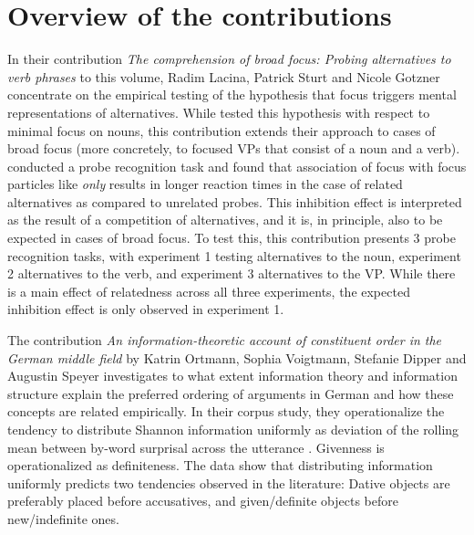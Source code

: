 \documentclass[output=paper,colorlinks,citecolor=brown]{langscibook}
\begin{document}
\section{Overview of the contributions}

In their contribution \textit{The comprehension of broad focus: Probing alternatives to verb phrases} to this volume, Radim Lacina, Patrick Sturt and Nicole Gotzner concentrate on the empirical testing of the hypothesis that focus triggers mental representations of alternatives. While \citet{gotzner2016impact} tested this hypothesis with respect to minimal focus on nouns, this contribution extends their approach to cases of broad focus (more concretely, to focused VPs that consist of a noun and a verb). \citet{gotzner2016impact} conducted a probe recognition task and found that association of focus with focus particles like \textit{only} results in longer reaction times in the case of related alternatives as compared to unrelated probes. This inhibition effect is interpreted as the result of a competition of alternatives, and it is, in principle, also to be expected in cases of broad focus. To test this, this contribution presents 3 probe recognition tasks, with experiment 1 testing alternatives to the noun, experiment 2 alternatives to the verb, and experiment 3 alternatives to the VP. While there is a main effect of relatedness across all three experiments, the expected inhibition effect is only observed in experiment 1.

The contribution \textit{An information-theoretic account of constituent order in the German middle field} by Katrin Ortmann, Sophia Voigtmann, Stefanie Dipper and Augustin Speyer investigates to what extent information theory and information structure explain the preferred ordering of arguments in German and how these concepts are related empirically. In their corpus study, they operationalize the tendency to distribute Shannon information uniformly as deviation of the rolling mean between by-word surprisal across the utterance \citep{cuskley21}. Givenness is operationalized as definiteness. The data show that distributing information uniformly predicts two tendencies observed in the literature: Dative objects are preferably placed before accusatives, and given/definite objects before new/indefinite ones. 
\end{document}
